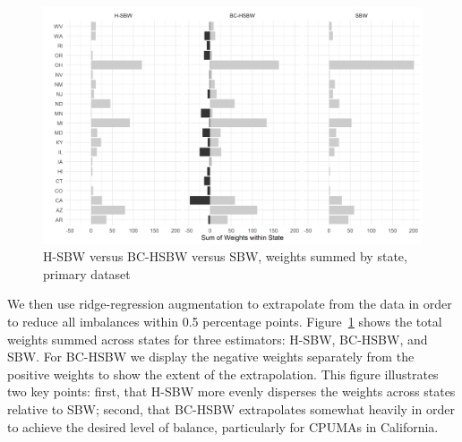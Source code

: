 \documentclass[aoas]{imsart}
\theoremstyle{plain}
\theoremstyle{remark}
\begin{document}
\begin{figure}[H]
\begin{center}
    \caption{H-SBW versus BC-HSBW versus SBW, weights summed by state, primary dataset}
    \label{fig:sbwvhsbw1}
    \includegraphics[scale=0.6]{01_Plots/weights-by-state-sbw-hsbw-c1.png}
\end{center}
\end{figure}

We then use ridge-regression augmentation to extrapolate from the data in order to reduce all imbalances within 0.5 percentage points. Figure~\ref{fig:sbwvhsbw1} shows the total weights summed across states for three estimators: H-SBW, BC-HSBW, and SBW. For BC-HSBW we display the negative weights separately from the positive weights to show the extent of the extrapolation. This figure illustrates two key points: first, that H-SBW more evenly disperses the weights across states relative to SBW; second, that BC-HSBW extrapolates somewhat heavily in order to achieve the desired level of balance, particularly for CPUMAs in California. 
\end{document}
